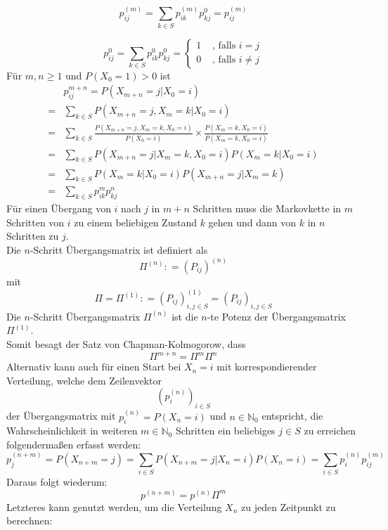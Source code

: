 \documentclass[a4paper,12pt]{article}
\begin{document}
$$
	p_{ij}^{(m)} = \sum_{k \in S} p_{ik}^{(m)}p_{kj}^{0} = p_{ij}^{(m)}
$$

$$
	p_{ij}^{0} = \sum_{k \in S} p_{ik}^{0}p_{kj}^{0} = \begin{cases}
		1 & \text{ , falls } i = j    \\
		0 & \text{ , falls } i \neq j\end{cases}
$$
Für $m,n \geq 1$ und $P(X_0 = 1) > 0$ ist
\begin{align*}
	  & p_{ij}^{m+n} = P(X_{m+n} = j | X_0 = i)                                                                                    \\
	= & \sum_{k \in S} P(X_{m+n} = j, X_m = k | X_0 = i)                                                                           \\
	= & \sum_{k \in S} \frac{P(X_{m+n} = j, X_m = k , X_0 = i)}{P(X_0 = i)} \times \frac{P(X_m = k, X_0 = i)}{P(X_m = k, X_0 = i)} \\
	= & \sum_{k \in S} P(X_{m+n}=j | X_m = k, X_0 = i)P(X_m = k|X_0 = i)                                                           \\
	= & \sum_{k \in S}P(X_m = k | X_0 = i)P(X_{m+n} = j |X_m = k)                                                                  \\
	= & \sum_{k \in S}p_{ik}^{m}p_{kj}^{n}
\end{align*}
Für einen Übergang von $i$ nach $j$ in $m+n$ Schritten muss die Markovkette in $m$ Schritten von $i$ zu einem beliebigen Zustand $k$ gehen und dann von $k$ in $n$ Schritten zu $j$.\\
Die $n$-Schritt Übergangsmatrix ist definiert als
$$
	\Pi^{(n)}: = (P_{ij})^{(n)}
$$
mit
$$
	\Pi = \Pi^{(1)}: = (P_{ij})^{(1)}_{i,j \in S} = (P_{ij})_{i,j \in S}
$$
Die $n$-Schritt Übergangsmatrix $\Pi^{(n)}$ ist die $n$-te Potenz der Übergangsmatrix $\Pi^{(1)}$.\\
Somit besagt der Satz von Chapman-Kolmogorow, dass
$$
	\Pi^{m+n} = \Pi^{m}\Pi^{n}
$$
Alternativ kann auch für einen Start bei $X_n = i$ mit korrespondierender Verteilung, welche dem
Zeilenvektor
$$
	(p_i^{(n)})_{i \in S}
$$
der Übergangsmatrix mit $p_i^{(n)} = P(X_n = i)$ und $n \in \mathbb{N}_0$ entspricht,
die Wahrscheinlichkeit in weiteren $m \in \mathbb{N}_0$ Schritten ein beliebiges $j \in S$ zu erreichen folgendermaßen
erfasst werden:
$$
	p_{j}^{(n+m)} = P(X_{n+m}=j) = \sum_{i \in S}P(X_{n+m} = j | X_n = i)P(X_n = i) = \sum_{i \in S}p_i^{(n)}p_{ij}^{(m)}
$$
Daraus folgt wiederum:
$$
	p^{(n+m)} = p^{(n)} \Pi^m
$$
Letzteres kann genutzt werden, um die Verteilung $X_n$ zu jeden Zeitpunkt zu berechnen:
\end{document}

